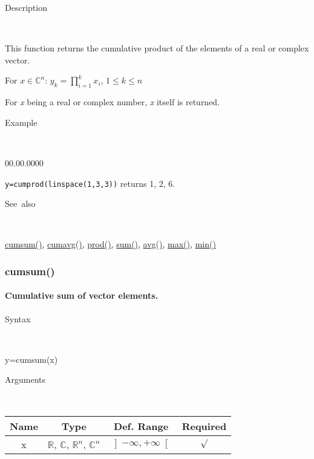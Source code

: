 \begin{description}
\item [Description]~
\end{description}
This function returns the cumulative product of the elements of a
real or complex vector.

\medskip{}
For $x\in$$\mathbb{C}^{n}$: $y_{k}=$$\prod\limits _{i=1}^{k}x_{i}$,
$1\leq k\leq n$
\medskip{}

For \textit{x} being a real or complex number, \textit{x} itself is
returned.

\begin{description}
\item [Example]~
\end{description}
\begin{lyxlist}{00.00.0000}
\item [\texttt{y=cumprod(linspace(1,3,3))}]returns 1, 2, 6.
\end{lyxlist}
\begin{description}
\item [See~also]~
\end{description}
\textcolor{blue}{\hyperlink{cumsum}{cumsum()}}\textcolor{black}{,}
\textcolor{blue}{\hyperlink{cumavg}{cumavg()}}\textcolor{black}{,}
\textcolor{blue}{\hyperlink{prod}{prod()}}\textcolor{black}{,} \textcolor{blue}{\hyperlink{sum}{sum()}}\textcolor{black}{,}
\textcolor{blue}{\hyperlink{avg}{avg()}}\textcolor{black}{,} \textcolor{blue}{\hyperlink{max}{max()}}\textcolor{black}{,}
\textcolor{blue}{\hyperlink{min}{min()}}


\newpage
\subsubsection*{\hypertarget{cumsum}{}{\Large cumsum()}}


\paragraph{\label{par:Cumulative-sum}Cumulative sum of vector elements.}

\begin{description}
\item [Syntax]~
\end{description}
y=cumsum(x)

\begin{description}
\item [Arguments]~
\end{description}
\begin{tabular}{|c|c|c|c|}
\hline 
Name&
Type&
Def. Range&
Required\tabularnewline
\hline
\hline 
x&
$\mathbb{R}$, $\mathbb{C}$, $\mathbb{R}^{n}$, $\mathbb{C}^{n}$&
$\left]-\infty,+\infty\right[$&
$\surd$\tabularnewline
\hline
\end{tabular}

